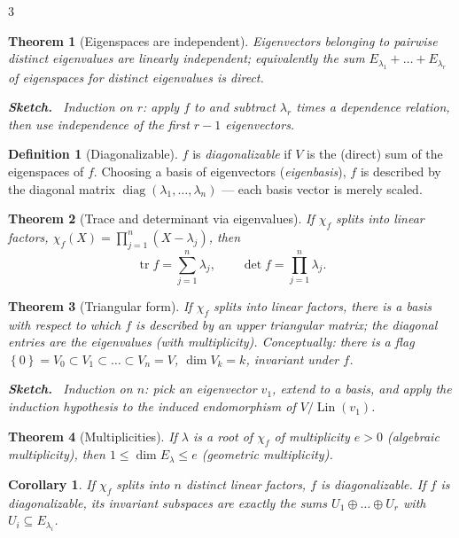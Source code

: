 \documentclass[10pt,a4paper,landscape]{article}
\theoremstyle{definition}
\newtheorem{defn}{Definition}[section]
\theoremstyle{plain}
\newtheorem{thm}{Theorem}[section]
\newtheorem{cor}{Corollary}[section]
\theoremstyle{remark}
\newcommand{\set}[1]{\left\{ #1 \right\}}
\DeclareMathOperator{\Lin}{Lin}
\DeclareMathOperator{\tr}{tr}
\newcommand{\dsum}{\oplus}
\newcommand{\Char}{\chi}
\newenvironment{proofsketch}{%
  \par\small\color{exgray}\textbf{Sketch.}\ }%
  {\par}
\begin{document}
\begin{multicols*}{3}
\begin{thm}[Eigenspaces are independent]
Eigenvectors belonging to pairwise distinct eigenvalues are linearly independent; equivalently the sum $E_{\lambda_1} + \dots + E_{\lambda_r}$ of eigenspaces for distinct eigenvalues is direct.
\begin{proofsketch}
Induction on $r$: apply $f$ to and subtract $\lambda_r$ times a dependence relation, then use independence of the first $r-1$ eigenvectors.
\end{proofsketch}
\end{thm}

\begin{defn}[Diagonalizable]
$f$ is \emph{diagonalizable} if $V$ is the (direct) sum of the eigenspaces of $f$. Choosing a basis of eigenvectors (\emph{eigenbasis}), $f$ is described by the diagonal matrix $\operatorname{diag}(\lambda_1, \dots, \lambda_n)$ --- each basis vector is merely scaled.
\end{defn}

\begin{thm}[Trace and determinant via eigenvalues]
If $\Char_f$ splits into linear factors, $\Char_f(X) = \prod_{j=1}^n (X - \lambda_j)$, then
\[
\tr f = \sum_{j=1}^n \lambda_j, \qquad \det f = \prod_{j=1}^n \lambda_j .
\]
\end{thm}

\begin{thm}[Triangular form]
If $\Char_f$ splits into linear factors, there is a basis with respect to which $f$ is described by an upper triangular matrix; the diagonal entries are the eigenvalues (with multiplicity). Conceptually: there is a \emph{flag} $\set{0} = V_0 \subset V_1 \subset \dots \subset V_n = V$, $\dim V_k = k$, invariant under $f$.
\begin{proofsketch}
Induction on $n$: pick an eigenvector $v_1$, extend to a basis, and apply the induction hypothesis to the induced endomorphism of $V / \Lin(v_1)$.
\end{proofsketch}
\end{thm}

\begin{thm}[Multiplicities]
If $\lambda$ is a root of $\Char_f$ of multiplicity $e > 0$ (algebraic multiplicity), then $1 \le \dim E_{\lambda} \le e$ (geometric multiplicity).
\end{thm}

\begin{cor}
If $\Char_f$ splits into $n$ \emph{distinct} linear factors, $f$ is diagonalizable. If $f$ is diagonalizable, its invariant subspaces are exactly the sums $U_1 \dsum \dots \dsum U_r$ with $U_i \subseteq E_{\lambda_i}$.
\end{cor}


\end{multicols*}
\end{document}
